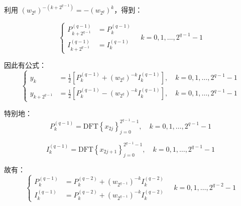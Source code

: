 \documentclass[linespread=1.5,openany]{book}%
\theoremstyle{plain}
\begin{document}
{{{					利用 $\left(w_{2^q}\right)^{-(k + 2^{q-1})} = -\left(w_{2^q}\right)^k$，得到：
					
					\begin{equation}
						\left\{
						\begin{aligned}
							P_{k + 2^{q-1}}^{(q-1)} &= P_k^{(q-1)} \\[8pt]
							I_{k + 2^{q-1}}^{(q-1)} &= I_k^{(q-1)}
						\end{aligned}
						\right.
						\quad k = 0, 1, \ldots, 2^{q-1} -1
					\end{equation}
					
					因此有公式：
					\begin{equation}
						\left\{
						\begin{aligned}
							y_k &= \frac{1}{2} \left[ P_k^{(q-1)} + \left(w_{2^q}\right)^{-k} I_k^{(q-1)} \right], \quad k = 0, 1, \ldots, 2^{q-1} -1 \\[8pt]
							y_{k + 2^{q-1}} &= \frac{1}{2} \left[ P_k^{(q-1)} - \left(w_{2^q}\right)^{-k} I_k^{(q-1)} \right], \quad k = 0, 1, \ldots, 2^{q-1} -1
						\end{aligned}
						\right.
					\end{equation}
					
					特别地：
					\begin{equation}
						P_k^{(q-1)} = \text{DFT} \left\{ x_{2j} \right\}_{j=0}^{2^{q-1} -1}, \quad k = 0, 1, \ldots, 2^{q-1} -1
					\end{equation}
					
					\begin{equation}
						I_k^{(q-1)} = \text{DFT} \left\{ x_{2j+1} \right\}_{j=0}^{2^{q-1} -1}, \quad k = 0, 1, \ldots, 2^{q-1} -1
					\end{equation}
					
					故有：
					\begin{equation}
						\left\{
						\begin{aligned}
							P_k^{(q-1)} &= P_k^{(q-2)} + \left(w_{2^{q-1}}\right)^{-k} I_k^{(q-2)} \\[8pt]
							I_k^{(q-1)} &= P_k^{(q-2)} + \left(w_{2^{q-1}}\right)^{-k} I_k^{(q-2)}
						\end{aligned}
						\right.
						\quad k = 0, 1, \ldots, 2^{q-2} -1
					\end{equation}
					
}}}
\end{document}
